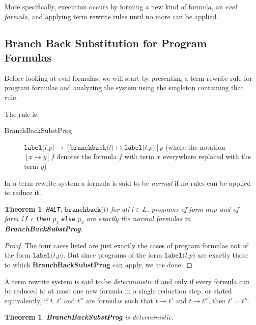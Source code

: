 \documentclass[11pt]{article}
\begin{document}
More specifically, execution occurs by forming a new kind of formula, an \emph{eval formula}, and applying term rewrite rules until no more can be applied.

\subsection{Branch Back Substitution for Program Formulas}

Before looking at eval formulas, we will start by presenting a term rewrite rule for program formulas and analyzing the system using the singleton containing that rule.

The rule is:

\begin{description}
\item[BranchBackSubstProg] $\texttt{label(}l\texttt{,} p\texttt{)} \longrightarrow [\texttt{branchback(}l\texttt{)} \mapsto \texttt{label(}l\texttt{,} p\texttt{)}]p$ (where the notation $[x \mapsto y]f$ denotes the formula $f$ with term $x$ everywhere replaced with the term $y$)
\end{description}

In a term rewrite system a formula is said to be \emph{normal} if no rules can be applied to reduce it.

\newtheorem*{branchbacksubstnormals}{Theorem}
\begin{branchbacksubstnormals}
\texttt{HALT}, $\texttt{branchback(}l\texttt{)}$ for all $l \in L$, programs of form $m\texttt{;}p$ and of form \texttt{if} $c$ \texttt{then} $p_{1}$ \texttt{else} $p_{2}$ are exactly the normal formulas in \textbf{BranchBackSubstProg}.
\end{branchbacksubstnormals}

\begin{proof}
The four cases listed are just exactly the cases of program formulas not of the form $\texttt{label(}l\texttt{,} p\texttt{)}$.  But since programs of the form $\texttt{label(}l\texttt{,} p\texttt{)}$ are exactly those to which \textbf{BranchBackSubstProg} can apply, we are done.
\end{proof}

A term rewrite system is said to be \emph{deterministic} if and only if every formula can be reduced to at most one new formula in a single reduction step, or stated equivalently, if $t$, $t'$ and $t''$ are formulas such that $t \rightarrow t'$ and $t \rightarrow t''$, then $t' = t''$.

\newtheorem*{branchbacksubstisdeterministic}{Theorem}
\begin{branchbacksubstisdeterministic}
\textbf{BranchBackSubstProg} is deterministic.
\end{branchbacksubstisdeterministic}
\end{document}

